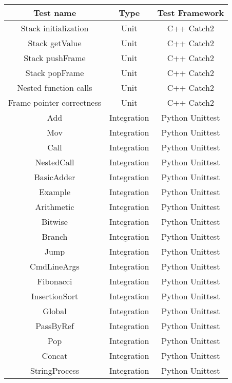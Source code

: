 \documentclass[manuscript,screen,nonacm]{acmart}
\begin{document}
\begin{center}
\begin{tabular}{|c|c|c|}
    \hline
    Test name & Type & Test Framework \\
    \hline
    Stack initialization & Unit & C++ Catch2 \\
    Stack getValue & Unit & C++ Catch2 \\
    Stack pushFrame & Unit & C++ Catch2 \\
    Stack popFrame & Unit & C++ Catch2 \\
    Nested function calls & Unit & C++ Catch2 \\
    Frame pointer correctness & Unit & C++ Catch2 \\
    Add & Integration & Python Unittest \\
    Mov & Integration & Python Unittest \\
    Call & Integration & Python Unittest \\
    NestedCall & Integration & Python Unittest \\
    BasicAdder & Integration & Python Unittest \\
    Example & Integration & Python Unittest \\
    Arithmetic & Integration & Python Unittest \\
    Bitwise & Integration & Python Unittest \\
    Branch & Integration & Python Unittest \\
    Jump & Integration & Python Unittest \\
    CmdLineArgs & Integration & Python Unittest \\
    Fibonacci & Integration & Python Unittest \\
    InsertionSort & Integration & Python Unittest \\
    Global & Integration & Python Unittest \\
    PassByRef & Integration & Python Unittest \\
    Pop & Integration & Python Unittest \\
    Concat & Integration & Python Unittest \\
    StringProcess & Integration & Python Unittest \\
    \hline
\end{tabular}
\end{center}
\end{document}
